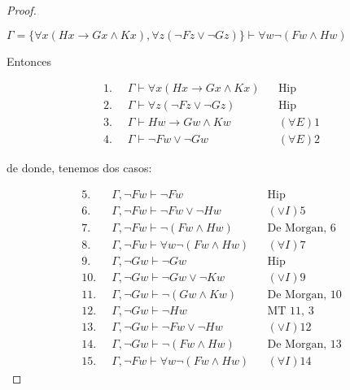 \documentclass[letterpaper,11pt]{article}
\begin{document}
\begin{enumerate}
\begin{itemize}
\begin{proof}
                \begin{center}
                    $\Gamma = \{\forall x (Hx \rightarrow Gx \land Kx), 
                    \forall z (\neg Fz \lor \neg Gz)\} \vdash \forall w 
                    \neg (Fw \land Hw)$
                \end{center}
                
                Entonces 
                
                \begin{align*}
                    1.\; \; &\Gamma \vdash \forall x (Hx \rightarrow Gx \land Kx)
                    && \text{Hip} \\
                    2. \; \; &\Gamma \vdash \forall z (\neg Fz \lor \neg Gz)
                    && \text{Hip} \\
                    3. \; \; &\Gamma \vdash Hw \rightarrow Gw \land Kw
                    && \text{$(\forall E) 1$} \\
                    4. \; \; &\Gamma \vdash \neg Fw \lor \neg Gw
                    && \text{$(\forall E) 2$}  
                \end{align*}

                de donde, tenemos dos casos:
                
                \begin{align*}
                    5. \; \; &\Gamma, \neg Fw \vdash \neg Fw
                    && \text{Hip} \\
                    6. \; \; &\Gamma, \neg Fw \vdash \neg Fw \lor \neg Hw
                    && \text{$(\lor I) 5$} \\ 
                    7. \; \; &\Gamma, \neg Fw \vdash \neg (Fw \land Hw)
                    && \text{De Morgan, 6} \\
                    8. \; \; &\Gamma, \neg Fw \vdash \forall w \neg (Fw \land Hw)
                    && \text{$(\forall I) 7$} \\
                    9. \; \; &\Gamma, \neg Gw \vdash \neg Gw
                    && \text{Hip} \\
                    10. \; \; &\Gamma, \neg Gw \vdash \neg Gw \lor \neg Kw
                    && \text{$(\lor I) 9$} \\ 
                    11. \; \; &\Gamma, \neg Gw \vdash \neg (Gw \land Kw)
                    && \text{De Morgan, 10} \\
                    12. \; \; &\Gamma, \neg Gw \vdash \neg Hw
                    && \text{MT 11, 3} \\
                    13.\; \; &\Gamma, \neg Gw \vdash \neg Fw \lor \neg Hw
                    && \text{$(\lor I) 12$} \\
                    14. \; \; &\Gamma, \neg Gw \vdash \neg (Fw \land Hw)
                    && \text{De Morgan, 13} \\
                    15. \; \; &\Gamma, \neg Fw \vdash \forall w \neg (Fw \land Hw)
                    && \text{$(\forall I) 14$} 
                \end{align*}


\end{proof}
\end{itemize}
\end{enumerate}
\end{document}
